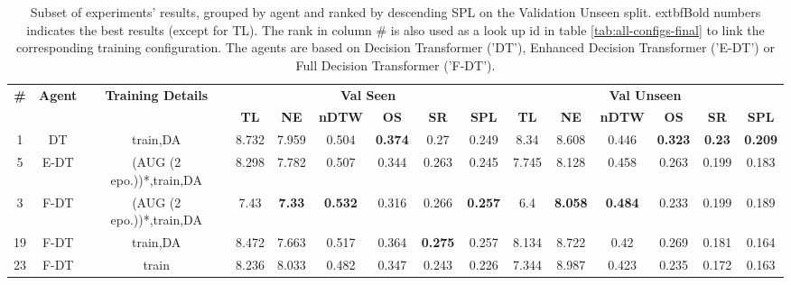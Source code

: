 \begin{table}
\centering
\caption{\label{tab:f_dt_final}Subset of experiments' results, grouped by agent and ranked by descending SPL on the Validation Unseen split. 	extbf{Bold} numbers indicates the best results (except for TL). The rank in column \# is also used as a look up id in table \ref{tab:all-configs-final} to link the corresponding training configuration.     \newline The agents are based on Decision Transformer ('DT'), Enhanced Decision Transformer ('E-DT') or Full Decision Transformer ('F-DT').}
\begin{tabular}{@{\hskip3pt}c@{\hskip3pt}c@{\hskip3pt}c@{\hskip3pt}c@{\hskip3pt}c@{\hskip3pt}c@{\hskip3pt}c@{\hskip3pt}c@{\hskip3pt}c@{\hskip3pt}c@{\hskip3pt}c@{\hskip3pt}c@{\hskip3pt}c@{\hskip3pt}c@{\hskip3pt}c}
\toprule
\textbf{\#} & \textbf{Agent} & \textbf{Training Details} & \multicolumn{6}{c}{\textbf{Val Seen}} & \multicolumn{6}{c}{\textbf{Val Unseen}} \\
 \textbf{~} &     \textbf{~} &                \textbf{~} &       \textbf{TL} &    \textbf{NE} &   \textbf{nDTW} &     \textbf{OS} &     \textbf{SR} &    \textbf{SPL} &         \textbf{TL} &     \textbf{NE} &   \textbf{nDTW} &     \textbf{OS} &    \textbf{SR} &    \textbf{SPL} \\
\midrule
          1 &             DT &                  train,DA &             8.732 &          7.959 &           0.504 &  \textbf{0.374} &            0.27 &           0.249 &                8.34 &           8.608 &           0.446 &  \textbf{0.323} &  \textbf{0.23} &  \textbf{0.209} \\
          5 &           E-DT &  (AUG (2 epo.))*,train,DA &             8.298 &          7.782 &           0.507 &           0.344 &           0.263 &           0.245 &               7.745 &           8.128 &           0.458 &           0.263 &          0.199 &           0.183 \\
          3 &           F-DT &  (AUG (2 epo.))*,train,DA &              7.43 &  \textbf{7.33} &  \textbf{0.532} &           0.316 &           0.266 &  \textbf{0.257} &                 6.4 &  \textbf{8.058} &  \textbf{0.484} &           0.233 &          0.199 &           0.189 \\
         19 &           F-DT &                  train,DA &             8.472 &          7.663 &           0.517 &           0.364 &  \textbf{0.275} &           0.257 &               8.134 &           8.722 &            0.42 &           0.269 &          0.181 &           0.164 \\
         23 &           F-DT &                     train &             8.236 &          8.033 &           0.482 &           0.347 &           0.243 &           0.226 &               7.344 &           8.987 &           0.423 &           0.235 &          0.172 &           0.163 \\
\bottomrule
\end{tabular}
\end{table}
